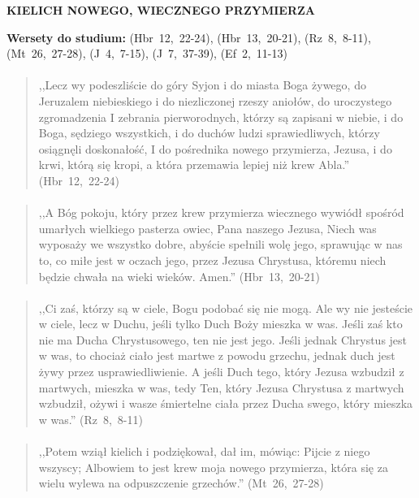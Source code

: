 \documentclass[10pt,a4paper,oneside]{article}
\begin{document}
\centerline{\textbf{\MakeUppercase{Kielich nowego, wiecznego przymierza}}}
\begin{center}
\textbf{Wersety do studium:} 
\mbox{(Hbr 12, 22-24)}, \mbox{(Hbr 13, 20-21)}, \mbox{(Rz 8, 8-11)}, \mbox{(Mt 26, 27-28)}, \mbox{(J 4, 7-15)}, \mbox{(J 7, 37-39)}, \mbox{(Ef 2, 11-13)}
\end{center}
\paragraph{}
\begin{quote}
,,Lecz wy podeszliście do góry Syjon i do miasta Boga żywego, do Jeruzalem niebieskiego i do niezliczonej rzeszy aniołów, do uroczystego zgromadzenia I zebrania pierworodnych, którzy są zapisani w niebie, i do Boga, sędziego wszystkich, i do duchów ludzi sprawiedliwych, którzy osiągnęli doskonałość, I do pośrednika nowego przymierza, Jezusa, i do krwi, którą się kropi, a która przemawia lepiej niż krew Abla.'' \mbox{(Hbr 12, 22-24)}
\end{quote}
\paragraph{}
\begin{quote}
,,A Bóg pokoju, który przez krew przymierza wiecznego wywiódł spośród umarłych wielkiego pasterza owiec, Pana naszego Jezusa, Niech was wyposaży we wszystko dobre, abyście spełnili wolę jego, sprawując w nas to, co miłe jest w oczach jego, przez Jezusa Chrystusa, któremu niech będzie chwała na wieki wieków. Amen.'' \mbox{(Hbr 13, 20-21)}
\end{quote}
\paragraph{}
\begin{quote}
,,Ci zaś, którzy są w ciele, Bogu podobać się nie mogą. Ale wy nie jesteście w ciele, lecz w Duchu, jeśli tylko Duch Boży mieszka w was. Jeśli zaś kto nie ma Ducha Chrystusowego, ten nie jest jego. Jeśli jednak Chrystus jest w was, to chociaż ciało jest martwe z powodu grzechu, jednak duch jest żywy przez usprawiedliwienie. A jeśli Duch tego, który Jezusa wzbudził z martwych, mieszka w was, tedy Ten, który Jezusa Chrystusa z martwych wzbudził, ożywi i wasze śmiertelne ciała przez Ducha swego, który mieszka w was.'' \mbox{(Rz 8, 8-11)}
\end{quote}
\paragraph{}
\begin{quote}
,,Potem wziął kielich i podziękował, dał im, mówiąc: Pijcie z niego wszyscy; Albowiem to jest krew moja nowego przymierza, która się za wielu wylewa na odpuszczenie grzechów.'' \mbox{(Mt 26, 27-28)}
\end{quote}
\end{document}
